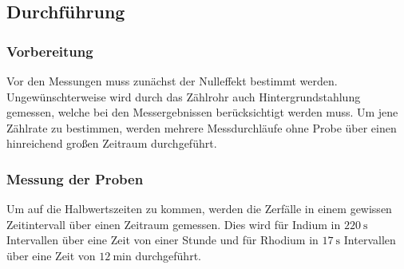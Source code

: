 \subsection{Durchführung}
\label{sec:durchführung}

\subsubsection{Vorbereitung}
Vor den Messungen muss zunächst der Nulleffekt bestimmt werden.
Ungewünschterweise wird durch das Zählrohr auch Hintergrundstahlung gemessen, welche bei den Messergebnissen berücksichtigt werden muss.
Um jene Zählrate zu bestimmen, werden mehrere Messdurchläufe ohne Probe über einen hinreichend großen Zeitraum durchgeführt.

\subsubsection{Messung der Proben}
Um auf die Halbwertszeiten zu kommen, werden die Zerfälle in einem gewissen Zeitintervall über einen Zeitraum gemessen.
Dies wird für Indium in $\SI{220}{\second}$ Intervallen über eine Zeit von einer Stunde und für Rhodium in $\SI{17}{\second}$ Intervallen über eine Zeit von $\SI{12}{\minute}$ durchgeführt.

